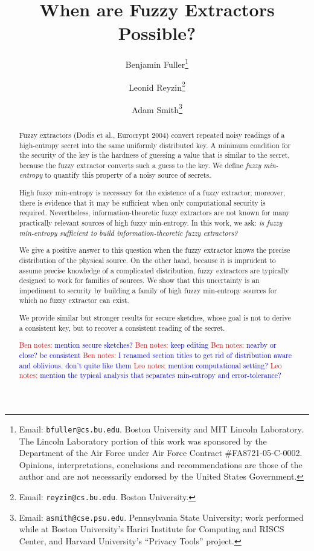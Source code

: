 \documentclass[11pt]{article}
\title{When are Fuzzy Extractors Possible?}
\author{
Benjamin Fuller\footnote{Email: {\tt bfuller@cs.bu.edu}.  Boston University and MIT Lincoln Laboratory. The Lincoln Laboratory portion of this work was sponsored by the Department of the Air Force under Air Force Contract \#FA8721-05-C-0002.  Opinions, interpretations, conclusions and recommendations are those of the author and are not necessarily endorsed by the United States Government.}  \and Leonid Reyzin\footnote{Email: {\tt reyzin@cs.bu.edu}.  Boston University.} \and Adam Smith\footnote{Email: {\tt asmith@cse.psu.edu}.  Pennsylvania State University; work performed while at Boston University's Hariri Institute for Computing and RISCS Center, and Harvard University's
``Privacy Tools'' project.}}
\newcommand{\authnote}[2]{{\textcolor{red}{\textsf{#1 notes: }\textcolor{blue}{ #2}}\marginpar{\textcolor{red}{\textbf{!!!!!}}}}}
\newcommand{\authnote}[2]{}
\newcommand{\bnote}[1]{{\authnote{Ben}{#1}}}
\newcommand{\lnote}[1]{{\authnote{Leo}{#1}}}
\begin{document}
\maketitle

\begin{abstract}
Fuzzy extractors (Dodis et al., Eurocrypt 2004) convert repeated noisy readings of a high-entropy secret into the same uniformly distributed key. A minimum condition for the security of the key is the hardness of guessing a value that is similar to the secret, because the fuzzy extractor converts such a guess to the key.
We define \emph{fuzzy min-entropy} to quantify this property of a noisy source of secrets.

High fuzzy min-entropy is necessary for the existence of a fuzzy extractor; moreover, there is evidence that it may be sufficient when only computational security is required. Nevertheless, information-theoretic fuzzy extractors are not known for many practically relevant sources of high fuzzy min-entropy. In this work, we ask: \emph{is fuzzy min-entropy sufficient to build information-theoretic fuzzy extractors?} 

We give a positive answer to this question when the fuzzy extractor knows the precise distribution of the physical source.  On the other hand, because it is imprudent to assume precise knowledge of a complicated distribution,  fuzzy extractors are typically designed to work for families of sources. We show that this uncertainty is an impediment to security by building a family of high fuzzy min-entropy sources for which no fuzzy extractor can exist.

We provide similar but stronger results for secure sketches, whose goal is not to derive a consistent key, but to recover a consistent reading of the secret.

\bnote{mention secure sketches?}
\bnote{keep editing}
\bnote{nearby or close?  be consistent}
\bnote{I renamed section titles to get rid of distribution aware and oblivious.  don't quite like them}
\lnote{mention computational setting?}
\lnote{mention the typical analysis that separates min-entropy and error-tolerance?}
\end{abstract}

\newpage
\tableofcontents\newpage
\end{document}
